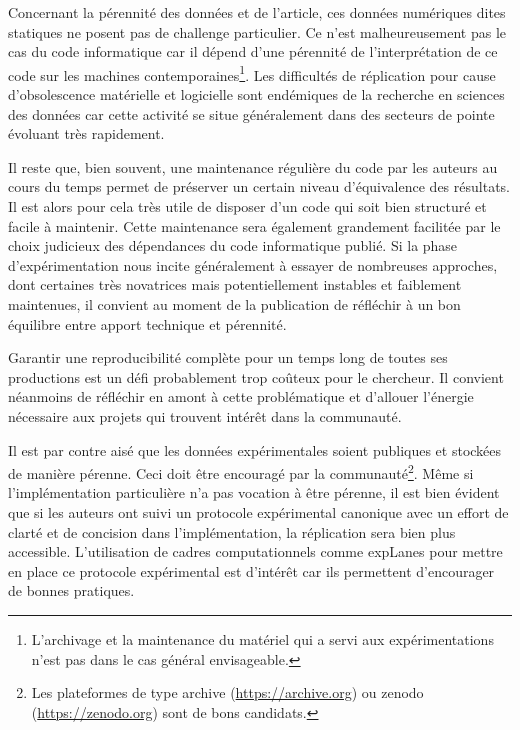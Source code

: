 Concernant la pérennité des données et de l'article, ces données numériques dites \og statiques \fg ne posent pas de challenge particulier. Ce n'est malheureusement pas le cas du code informatique car il dépend d'une pérennité de l'interprétation de ce code sur les machines contemporaines\footnote{L'archivage et la maintenance du matériel qui a servi aux expérimentations n'est pas dans le cas général envisageable.}. Les difficultés de réplication pour cause d'obsolescence matérielle et logicielle sont endémiques de la recherche en sciences des données car cette activité se situe généralement dans des secteurs de pointe évoluant très rapidement.

Il reste que, bien souvent, une maintenance régulière du code par les auteurs au cours du temps permet de préserver un certain niveau d'équivalence des résultats. Il est alors pour cela très utile de disposer d'un code qui soit bien structuré et facile à maintenir. Cette maintenance sera également grandement facilitée par le choix judicieux des dépendances du code informatique publié. Si la phase d'expérimentation nous incite généralement à essayer de nombreuses approches, dont certaines très novatrices mais potentiellement instables et faiblement maintenues, il convient au moment de la publication de réfléchir à un bon équilibre entre apport technique et pérennité.

Garantir une reproducibilité complète pour un temps long de toutes ses productions est un défi probablement trop coûteux pour le chercheur. Il convient néanmoins de réfléchir en amont à cette problématique et d'allouer l'énergie nécessaire aux projets qui trouvent intérêt dans la communauté.

Il est par contre aisé que les données expérimentales soient publiques et stockées de manière pérenne. Ceci doit être encouragé par la communauté\footnote{Les plateformes de type archive (\url{https://archive.org}) ou zenodo (\url{https://zenodo.org}) sont de bons candidats.}. Même si l'implémentation particulière n'a pas vocation à être pérenne, il est bien évident que si les auteurs ont suivi un protocole expérimental canonique avec un effort de clarté et de concision dans l'implémentation, la réplication sera bien plus accessible. L'utilisation de cadres computationnels comme expLanes pour mettre en place ce protocole expérimental est d'intérêt car ils permettent d'encourager de bonnes pratiques.
